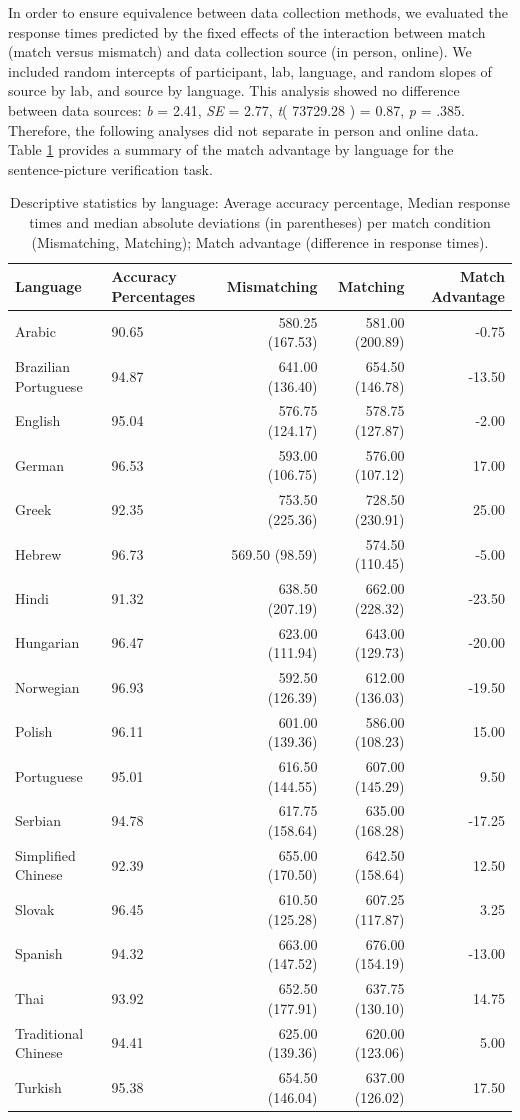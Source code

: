 \documentclass[
  man]{apa7}
\begin{document}
In order to ensure equivalence between data collection methods, we evaluated the response times predicted by the fixed effects of the interaction between match (match versus mismatch) and data collection source (in person, online). We included random intercepts of participant, lab, language, and random slopes of source by lab, and source by language. This analysis showed no difference between data sources: \emph{b} = 2.41, \emph{SE} = 2.77, \emph{t}( 73729.28 ) = 0.87, \emph{p} = .385. Therefore, the following analyses did not separate in person and online data. Table \ref{tab:summary-languages} provides a summary of the match advantage by language for the sentence-picture verification task.

\begin{table}

\caption{\label{tab:summary-languages}Descriptive statistics by language: Average accuracy percentage, Median response times and median absolute deviations (in parentheses) per match condition (Mismatching, Matching); Match advantage (difference in response times).}
\centering
\begin{tabular}[t]{llrrr}
\toprule
Language & Accuracy Percentages & Mismatching & Matching & Match Advantage\\
\midrule
Arabic & 90.65 & 580.25 (167.53) & 581.00 (200.89) & -0.75\\
Brazilian Portuguese & 94.87 & 641.00 (136.40) & 654.50 (146.78) & -13.50\\
English & 95.04 & 576.75 (124.17) & 578.75 (127.87) & -2.00\\
German & 96.53 & 593.00 (106.75) & 576.00 (107.12) & 17.00\\
Greek & 92.35 & 753.50 (225.36) & 728.50 (230.91) & 25.00\\
\addlinespace
Hebrew & 96.73 & 569.50 (98.59) & 574.50 (110.45) & -5.00\\
Hindi & 91.32 & 638.50 (207.19) & 662.00 (228.32) & -23.50\\
Hungarian & 96.47 & 623.00 (111.94) & 643.00 (129.73) & -20.00\\
Norwegian & 96.93 & 592.50 (126.39) & 612.00 (136.03) & -19.50\\
Polish & 96.11 & 601.00 (139.36) & 586.00 (108.23) & 15.00\\
\addlinespace
Portuguese & 95.01 & 616.50 (144.55) & 607.00 (145.29) & 9.50\\
Serbian & 94.78 & 617.75 (158.64) & 635.00 (168.28) & -17.25\\
Simplified Chinese & 92.39 & 655.00 (170.50) & 642.50 (158.64) & 12.50\\
Slovak & 96.45 & 610.50 (125.28) & 607.25 (117.87) & 3.25\\
Spanish & 94.32 & 663.00 (147.52) & 676.00 (154.19) & -13.00\\
\addlinespace
Thai & 93.92 & 652.50 (177.91) & 637.75 (130.10) & 14.75\\
Traditional Chinese & 94.41 & 625.00 (139.36) & 620.00 (123.06) & 5.00\\
Turkish & 95.38 & 654.50 (146.04) & 637.00 (126.02) & 17.50\\
\bottomrule
\end{tabular}
\end{table}
\end{document}
